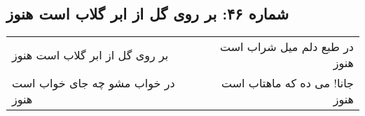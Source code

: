 \begin{center}
\section*{شماره ۴۶: بر روی گل از ابر گلاب است هنوز}
\label{sec:046}
\begin{longtable}{l p{0.5cm} r}
بر روی گل از ابر گلاب است هنوز
&&
در طبع دلم میل شراب است هنوز
\\
در خواب مشو چه جای خواب است هنوز
&&
جانا! می ده که ماهتاب است هنوز
\\
\end{longtable}
\end{center}
